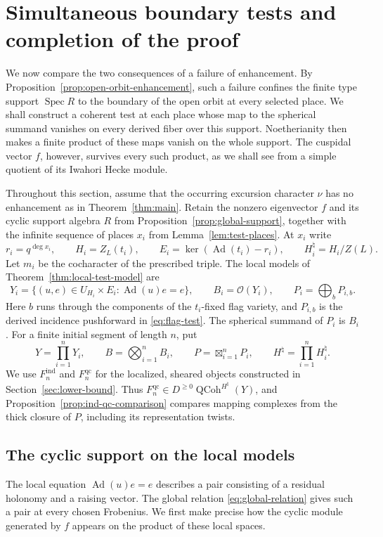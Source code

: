 \documentclass[11pt]{article}
\numberwithin{equation}{section}
\theoremstyle{definition}
\theoremstyle{remark}
\newcommand{\cO}{\mathcal O}
\newcommand{\Ad}{\operatorname{Ad}}
\newcommand{\QCoh}{\operatorname{QCoh}}
\newcommand{\Spec}{\operatorname{Spec}}
\begin{document}
\section{Simultaneous boundary tests and completion of the proof}
\label{sec:boundary}

We now compare the two consequences of a failure of enhancement.  By
Proposition~\ref{prop:open-orbit-enhancement}, such a failure confines the
finite type support $\Spec R$ to the boundary of the open orbit at every
selected place.  We shall construct a coherent test at each place whose
map to the spherical summand vanishes on every derived fiber over this
support.  Noetherianity then makes a finite product of these maps vanish
on the whole support.  The cuspidal vector $f$, however, survives every
such product, as we shall see from a simple quotient of its Iwahori
Hecke module.

Throughout this section, assume that the occurring excursion character
$\nu$ has no enhancement as in Theorem~\ref{thm:main}.  Retain the
nonzero eigenvector $f$ and its cyclic support algebra $R$ from
Proposition~\ref{prop:global-support}, together with the infinite sequence
of places $x_i$ from Lemma~\ref{lem:test-places}.  At $x_i$ write
\[
 r_i=q^{\deg x_i},\qquad H_i=Z_L(t_i),\qquad
 E_i=\ker(\Ad(t_i)-r_i),\qquad H_i^\natural=H_i/Z(L).
\]
Let $m_i$ be the cocharacter of the prescribed triple.  The local models
of Theorem~\ref{thm:local-test-model} are
\[
 Y_i=\{(u,e)\in U_{H_i}\times E_i:\Ad(u)e=e\},\qquad
 B_i=\cO(Y_i),\qquad P_i=\bigoplus_b P_{i,b}.
\]
Here $b$ runs through the components of the $t_i$-fixed flag variety, and
$P_{i,b}$ is the derived incidence pushforward in
\eqref{eq:flag-test}.  The spherical summand of $P_i$ is $B_i$.
For a finite initial segment of length $n$, put
\[
 Y=\prod_{i=1}^nY_i,\qquad B=\bigotimes_{i=1}^nB_i,\qquad
 P=\boxtimes_{i=1}^nP_i,\qquad H^\natural=\prod_{i=1}^nH_i^\natural.
\]
We use $F_n^{\mathrm{ind}}$ and $F_n^{\mathrm{qc}}$ for the localized,
sheared objects constructed in Section~\ref{sec:lower-bound}.  Thus
$F_n^{\mathrm{qc}}\in D^{\geq0}\QCoh^{H^\natural}(Y)$, and
Proposition~\ref{prop:ind-qc-comparison} compares mapping complexes from
the thick closure of $P$, including its representation twists.

\subsection{The cyclic support on the local models}

The local equation $\Ad(u)e=e$ describes a pair consisting of a residual
holonomy and a raising vector.  The global relation
\eqref{eq:global-relation} gives such a pair at every chosen Frobenius.
We first make precise how the cyclic module generated by $f$ appears on
the product of these local spaces.
\end{document}
